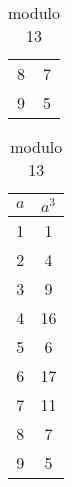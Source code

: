 \begin{table}[H]
\begin{subtable}{.24\linewidth}
\begin{tabular}{c|c}
		8   & 7  \\
		9   & 5
	\end{tabular}
	\caption*{modulo 11}
\end{subtable}
\begin{subtable}{.24\linewidth}
	\centering
	\begin{tabular}{c|c}
		$a$ & $a^3$ \\ \hline
		1   & 1  \\
		2   & 4  \\
		3   & 9  \\
		4   & 16 \\
		5   & 6  \\
		6   & 17 \\
		7   & 11 \\
		8   & 7  \\
		9   & 5
	\end{tabular}
	\caption*{modulo 13}
\end{subtable}
\end{table}

